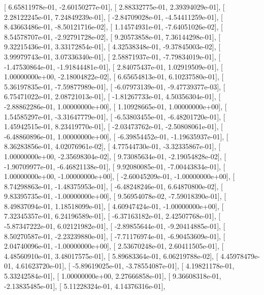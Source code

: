 \documentclass{article}
\begin{document}
       [  6.65811978e-01,  -2.60150277e-01],
       [  2.88332775e-01,   2.39394029e-01],
       [  2.28122245e-01,   7.24849239e-01],
       [ -2.84709028e-01,  -4.54411259e-01],
       [  8.43663486e-01,  -8.50121716e-02],
       [  1.14574931e-01,  -7.64051026e-02],
       [  8.54578707e-01,  -2.92791728e-02],
       [  9.20573858e-01,   7.36144298e-01],
       [  9.32215436e-01,   3.33172854e-01],
       [  4.32538348e-01,  -9.37845003e-02],
       [  3.99979743e-01,   3.07336340e-01],
       [  2.58871937e-01,  -7.79834019e-01],
       [ -1.47530864e-01,  -1.91844481e-01],
       [  2.84075437e-01,   1.02919509e-01],
       [  1.00000000e+00,  -2.18004822e-02],
       [  6.65654813e-01,   6.10237580e-01],
       [  5.36197835e-01,  -7.59877989e-01],
       [ -6.07973139e-01,  -9.47739377e-03],
       [  6.75471022e-01,   2.08721013e-01],
       [ -1.81267733e-01,   4.50356304e-01],
       [ -2.88862286e-01,   1.00000000e+00],
       [  1.10928665e-01,   1.00000000e+00],
       [  1.54585297e-01,  -3.31647779e-01],
       [ -6.53803455e-01,  -6.48201720e-01],
       [  1.45942515e-01,   8.23419770e-01],
       [ -2.03473762e-01,  -2.50808061e-01],
       [ -6.48860896e-01,   1.00000000e+00],
       [ -6.39854452e-01,  -1.19635937e-01],
       [  8.36283856e-01,   4.02076961e-02],
       [  4.77544730e-01,  -3.32335867e-01],
       [  1.00000000e+00,  -2.35698304e-02],
       [  9.73085634e-01,  -2.19054828e-02],
       [ -1.90709977e-01,  -6.46821138e-01],
       [  9.92080085e-01,  -7.00443834e-01],
       [  1.00000000e+00,  -1.00000000e+00],
       [ -2.60045209e-01,  -1.00000000e+00],
       [  8.74298863e-01,  -1.48375953e-01],
       [ -6.48248246e-01,   6.64870800e-02],
       [  9.83395735e-01,  -1.00000000e+00],
       [  9.56954078e-02,  -7.59018390e-01],
       [  8.49837094e-01,   1.18518099e-01],
       [  4.60947424e-01,  -1.00000000e+00],
       [  7.32345357e-01,   6.24196589e-01],
       [ -6.37163182e-01,   2.42507768e-01],
       [ -5.87347222e-01,   6.02121982e-01],
       [ -2.89855644e-01,  -9.20414885e-01],
       [  8.50270587e-01,  -2.23239880e-01],
       [ -7.71176974e-01,  -6.90453609e-01],
       [  2.04740096e-01,  -1.00000000e+00],
       [  2.53670248e-01,   2.60411505e-01],
       [  4.48560910e-01,   3.48017575e-01],
       [  5.89683364e-01,   6.06219788e-02],
       [  4.45978479e-01,   4.61623720e-01],
       [ -5.89619025e-01,  -3.78554087e-01],
       [  4.19821178e-01,   5.33242584e-01],
       [  1.00000000e+00,   2.27666858e-01],
       [  9.36608318e-01,  -2.13835485e-01],
       [  5.11228324e-01,   4.14376316e-01],
\end{document}
